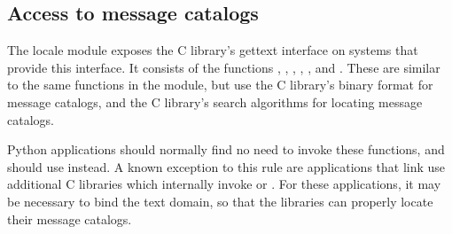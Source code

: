 \subsection{Access to message catalogs \label{locale-gettext}}

The locale module exposes the C library's gettext interface on systems
that provide this interface.  It consists of the functions
, , ,
, , and
.  These are similar to the same
functions in the  module, but use the C library's
binary format for message catalogs, and the C library's search
algorithms for locating message catalogs. 

Python applications should normally find no need to invoke these
functions, and should use  instead.  A known
exception to this rule are applications that link use additional C
libraries which internally invoke  or
.  For these applications, it may be necessary to
bind the text domain, so that the libraries can properly locate their
message catalogs.

